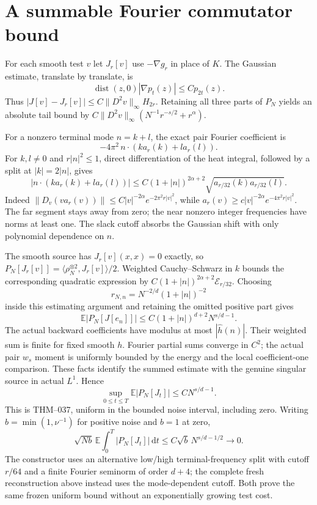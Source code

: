 \documentclass[10pt]{article}
\newcommand{\E}{\mathbb E}
\newcommand{\dd}{\,\mathrm d}
\begin{document}
\newpage
\section*{A summable Fourier commutator bound}
For each smooth test $v$ let $J_r[v]$ use $-\nabla g_r$ in place of $K$.
The Gaussian estimate, translate by translate, is
\[
 \operatorname{dist}(z,0)|\nabla p_t(z)|\le C p_{2t}(z).
\]
Thus $|J[v]-J_r[v]|\le C\|D^2v\|_\infty H_{2r}$. Retaining all three
parts of $P_N$ yields an absolute tail bound by
$C\|D^2v\|_\infty(N^{-1}r^{-s/2}+r^\alpha)$.

For a nonzero terminal mode $n=k+l$, the exact pair Fourier coefficient is
\[
 -4\pi^2\,n\cdot(k a_r(k)+l a_r(l)).
\]
For $k,l\ne0$ and $r|n|^2\le1$, direct differentiation of the heat integral,
followed by a split at $|k|=2|n|$, gives
\[
 |n\cdot(k a_r(k)+l a_r(l))|
 \le C(1+|n|)^{2\alpha+2}\sqrt{a_{r/32}(k)a_{r/32}(l)}.
\]
Indeed $\|D_v(v a_r(v))\|\le C|v|^{-2\alpha}e^{-2\pi^2r|v|^2}$,
while $a_r(v)\ge c|v|^{-2\alpha}e^{-4\pi^2r|v|^2}$.
The far segment stays away from zero; the near nonzero integer frequencies
have norms at least one. The slack cutoff absorbs the Gaussian shift with
only polynomial dependence on $n$.

The smooth source has $J_r[v](x,x)=0$ exactly, so
$P_N[J_r[v]]=\langle\rho_N^{\otimes2},J_r[v]\rangle/2$.
Weighted Cauchy--Schwarz in $k$ bounds the corresponding quadratic expression
by $C(1+|n|)^{2\alpha+2}\mathcal E_{r/32}$. Choosing
\[
 r_{N,n}=N^{-2/d}(1+|n|)^{-2}
\]
inside this estimating argument and retaining the omitted positive part gives
\[
 \E|P_N[J[e_n]]|\le C(1+|n|)^{d+2}N^{s/d-1}.
\]
The actual backward coefficients have modulus at most $|\widehat h(n)|$.
Their weighted sum is finite for fixed smooth $h$. Fourier partial sums
converge in $C^2$; the actual pair $w_s$ moment is uniformly bounded by the
energy and the local coefficient-one comparison. These facts identify the
summed estimate with the genuine singular source in actual $L^1$. Hence
\[
 \boxed{\ \sup_{0\le t\le T}\E|P_N[J_t]|\le C N^{s/d-1}.\ }
\]
This is THM--037, uniform in the bounded noise interval, including zero.
Writing $b=\min(1,\nu^{-1})$ for positive noise and $b=1$ at zero,
\[
 \sqrt{Nb}\,\E\int_0^T|P_N[J_t]|\dd t
 \le C\sqrt b\,N^{s/d-1/2}\longrightarrow0.
\]
The constructor uses an alternative low/high terminal-frequency split with
cutoff $r/64$ and a finite Fourier seminorm of order $d+4$; the complete
fresh reconstruction above instead uses the mode-dependent cutoff. Both
prove the same frozen uniform bound without an exponentially growing test cost.
\end{document}
